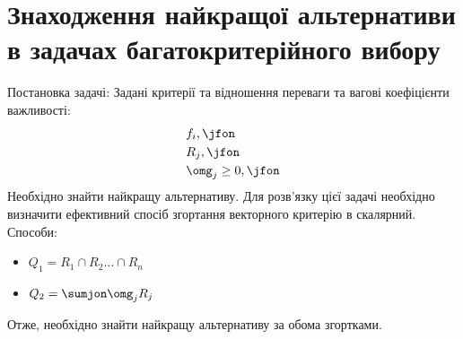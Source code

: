 \section{Знаходження найкращої альтернативи в задачах багатокритерійного вибору}
Постановка задачі:
Задані критерії та відношення переваги та вагові коефіцієнти важливості:
\begin{eqnarray}
&f_i,\jfon\\
&R_j,\jfon\\
&\omg_j\geq 0,\jfon
\end{eqnarray}
Необхідно знайти найкращу альтернативу. Для розв’язку цієї задачі необхідно визначити ефективний спосіб згортання векторного критерію в скалярний.
Способи:
\begin{itemize}
\item $Q_1=R_1\cap R_2\ldots\cap R_n$
\item $Q_2=\sumjon \omg_j R_j$
\end{itemize}
Отже, необхідно знайти найкращу альтернативу за обома згортками. \\
